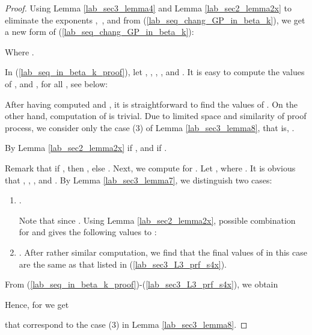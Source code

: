 \documentclass{mcom-l}
\theoremstyle{definition}
\numberwithin{equation}{section}
\begin{document}
     \begin{proof}
     Using Lemma \ref{lab_sec3_lemma4} and Lemma \ref{lab_sec2_lemma2x} to eliminate the exponents ,\  , and  from (\ref{lab_seq_chang_GP_in_beta_k}), we get a new form of (\ref{lab_seq_chang_GP_in_beta_k}):
     
     Where .
     
     In (\ref{lab_seq_in_beta_k_proof}), let , , , , and . It is easy to compute  the values of , and , for all , see below:
     
     
     After having computed  and , it is straightforward to find the values of . On the other hand, computation of  is trivial. Due to limited space and similarity of proof process, we consider only the case (3) of Lemma \ref{lab_sec3_lemma8}, that is, . 
     
     By Lemma \ref{lab_sec2_lemma2x}  if , and  if .
     
     Remark that if  , then , else . Next, we compute  for  . Let ,  where . It is obvious that , , , and . By Lemma \ref{lab_sec3_lemma7}, we distinguish two cases:
     \begin{enumerate}
     \item .
     
     Note that  since . Using Lemma \ref{lab_sec2_lemma2x}, possible combination for  and  gives the following values to :
     
     \item .
      After rather similar computation, we find that the final values of  in this case are the same as that listed in (\ref{lab_sec3_L3_prf_s4x}).
     \end{enumerate}
     
     From (\ref{lab_seq_in_beta_k_proof})-(\ref{lab_sec3_L3_prf_s4x}), we obtain
     
     
     Hence, for  we get 
     
     that correspond to the case (3) in Lemma \ref{lab_sec3_lemma8}.
     \end{proof} 
     
\end{document}
